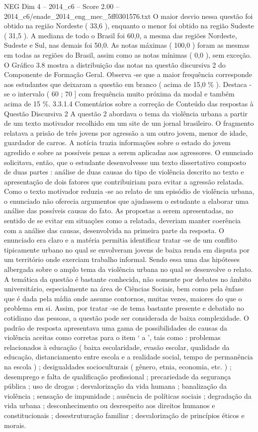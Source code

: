 \begin{textsample}{NEG Dim 4 – 2014\_c6 – Score 2.00 – 2014\_c6/enade\_2014\_eng\_mec\_5ff0301576.txt}
O maior desvio nessa questão foi obtido na região Nordeste ( 33,6 ), enquanto o menor foi obtido na região Sudeste ( 31,5 ).
A mediana de todo o Brasil foi 60,0, a mesma das regiões Nordeste, Sudeste e Sul, nas demais foi 50,0.
As notas máximas ( 100,0 ) foram as mesmas em todas as regiões do Brasil, assim como as notas mínimas ( 0,0 ), sem exceção.
O Gráfico 3.8 mostra a distribuição das notas na questão discursiva 2 do Componente de Formação Geral.
Observa -se que a maior frequência corresponde aos estudantes que deixaram a questão em branco ( acima de 15,0 \% ).
Destaca -se o intervalo ( 60 ; 70 ] com frequência muito próxima da modal e também acima de 15 \%. 3.3.1.4 Comentários sobre a correção de Conteúdo das respostas à Questão Discursiva 2 A questão 2 abordava o tema da violência urbana a partir de um texto motivador recolhido em um site de um jornal brasileiro.
O fragmento relatava a prisão de três jovens por agressão a um outro jovem, menor de idade, guardador de carros.
A notícia trazia informações sobre o estado do jovem agredido e sobre as possíveis penas a serem aplicadas aos agressores.
O enunciado solicitava, então, que o estudante desenvolvesse um texto dissertativo composto de duas partes : análise de duas causas do tipo de violência descrito no texto e apresentação de dois fatores que contribuiriam para evitar a agressão relatada.
Como o texto motivador reduzia -se ao relato de um episódio de violência urbana, o enunciado não oferecia argumentos que ajudassem o estudante a elaborar uma análise das possíveis causas do fato.
As propostas a serem apresentadas, no sentido de se evitar em situações como a relatada, deveriam manter coerência com a análise das causas, desenvolvida na primeira parte da resposta.
O enunciado era claro e a matéria permitia identificar tratar -se de um conflito tipicamente urbano no qual se envolveram jovens de baixa renda em disputa por um território onde exerciam trabalho informal.
Sendo essa uma das hipóteses albergada sobre o amplo tema da violência urbana no qual se desenvolve o relato.
A temática da questão é bastante conhecida, não somente por debates no âmbito universitário, especialmente na área de Ciências Sociais, bem como pela ênfase que é dada pela mídia onde assume contornos, muitas vezes, maiores do que o problema em si.
Assim, por tratar -se de tema bastante presente e debatido no cotidiano das pessoas, a questão pode ser considerada de baixa complexidade.
O padrão de resposta apresentava uma gama de possibilidades de causas da violência aceitas como corretas para o item ‘ a ’, tais como : problemas relacionados à educação ( baixa escolaridade, evasão escolar, qualidade da educação, distanciamento entre escola e a realidade social, tempo de permanência na escola ) ; desigualdades socioculturais ( gênero, etnia, economia, etc. ) ; desemprego e falta de qualificação profissional ; precariedade da segurança pública ; uso de drogas ; desvalorização da vida humana ; banalização da violência ; sensação de impunidade ; ausência de políticas sociais ; degradação da vida urbana ; desconhecimento ou desrespeito aos direitos humanos e constitucionais ; desestruturação familiar ; desvalorização de princípios éticos e morais.

\end{textsample}
